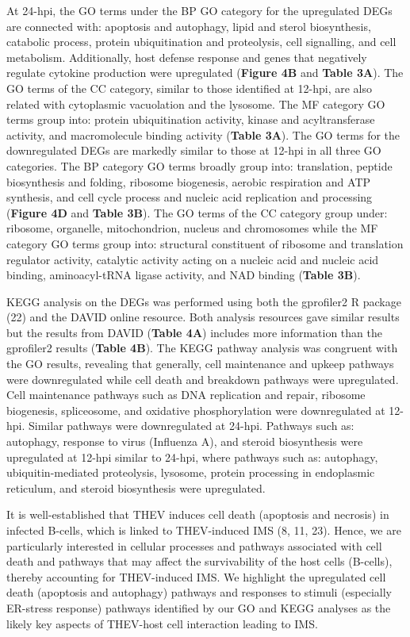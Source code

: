 \documentclass[
]{article}
\begin{document}
At 24-hpi, the GO terms under the BP GO category for the upregulated
DEGs are connected with: apoptosis and autophagy, lipid and sterol
biosynthesis, catabolic process, protein ubiquitination and proteolysis,
cell signalling, and cell metabolism. Additionally, host defense
response and genes that negatively regulate cytokine production were
upregulated (\textbf{Figure 4B} and \textbf{Table 3A}). The GO terms of
the CC category, similar to those identified at 12-hpi, are also related
with cytoplasmic vacuolation and the lysosome. The MF category GO terms
group into: protein ubiquitination activity, kinase and acyltransferase
activity, and macromolecule binding activity (\textbf{Table 3A}). The GO
terms for the downregulated DEGs are markedly similar to those at 12-hpi
in all three GO categories. The BP category GO terms broadly group into:
translation, peptide biosynthesis and folding, ribosome biogenesis,
aerobic respiration and ATP synthesis, and cell cycle process and
nucleic acid replication and processing (\textbf{Figure 4D} and
\textbf{Table 3B}). The GO terms of the CC category group under:
ribosome, organelle, mitochondrion, nucleus and chromosomes while the MF
category GO terms group into: structural constituent of ribosome and
translation regulator activity, catalytic activity acting on a nucleic
acid and nucleic acid binding, aminoacyl-tRNA ligase activity, and NAD
binding (\textbf{Table 3B}).

KEGG analysis on the DEGs was performed using both the gprofiler2 R
package (22) and the DAVID online resource. Both analysis resources gave
similar results but the results from DAVID (\textbf{Table 4A}) includes
more information than the gprofiler2 results (\textbf{Table 4B}). The
KEGG pathway analysis was congruent with the GO results, revealing that
generally, cell maintenance and upkeep pathways were downregulated while
cell death and breakdown pathways were upregulated. Cell maintenance
pathways such as DNA replication and repair, ribosome biogenesis,
spliceosome, and oxidative phosphorylation were downregulated at 12-hpi.
Similar pathways were downregulated at 24-hpi. Pathways such as:
autophagy, response to virus (Influenza A), and steroid biosynthesis
were upregulated at 12-hpi similar to 24-hpi, where pathways such as:
autophagy, ubiquitin-mediated proteolysis, lysosome, protein processing
in endoplasmic reticulum, and steroid biosynthesis were upregulated.

It is well-established that THEV induces cell death (apoptosis and
necrosis) in infected B-cells, which is linked to THEV-induced IMS (8,
11, 23). Hence, we are particularly interested in cellular processes and
pathways associated with cell death and pathways that may affect the
survivability of the host cells (B-cells), thereby accounting for
THEV-induced IMS. We highlight the upregulated cell death (apoptosis and
autophagy) pathways and responses to stimuli (especially ER-stress
response) pathways identified by our GO and KEGG analyses as the likely
key aspects of THEV-host cell interaction leading to IMS.
\end{document}
